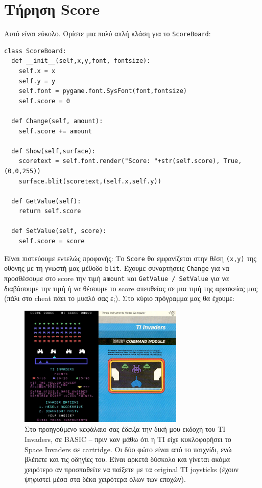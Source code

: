 \section{Τήρηση Score}
%
Αυτό είναι εύκολο. Ορίστε μια πολύ απλή κλάση για το {\tt ScoreBoard}:

\begin{verbatim}
class ScoreBoard:
  def __init__(self,x,y,font, fontsize):
    self.x = x
    self.y = y
    self.font = pygame.font.SysFont(font,fontsize)
    self.score = 0
        
  def Change(self, amount):
    self.score += amount

  def Show(self,surface):
    scoretext = self.font.render("Score: "+str(self.score), True, (0,0,255))
    surface.blit(scoretext,(self.x,self.y))

  def GetValue(self):
    return self.score

  def SetValue(self, score):
    self.score = score
\end{verbatim}

Είναι πιστεύουμε εντελώς προφανής: Το {\tt Score} θα εμφανίζεται στην θέση {\tt (x,y)} της οθόνης με τη γνωστή μας μέθοδο {\tt blit}. Έχουμε συναρτήσεις {\tt Change} για να προσθέσουμε στο score την τιμή {\tt amount} και {\tt GetValue / SetValue} για να διαβάσουμε την τιμή ή να θέσουμε το score απευθείας σε μια τιμή της αρεσκείας μας (πάλι στο cheat πάει το μυαλό σας ε;). Στο κύριο πρόγραμμα μας θα έχουμε:

\begin{figure}
\centering
\includegraphics[width=0.70\textwidth]{images/chapter9/ti-invaders}
\caption[TI Invaders]{Στο προηγούμενο κεφάλαιο σας έδειξα την δική μου εκδοχή του TI Invaders, σε BASIC -- πριν καν μάθω ότι η TI είχε κυκλοφορήσει το Space Invaders σε cartridge.  Οι δύο φώτο είναι από το παιχνίδι, ενώ βλέπετε και τις οδηγίες του. Είναι αρκετά δύσκολο και γίνεται ακόμα χειρότερο αν προσπαθείτε να παίξετε με τα original TI joysticks (έχουν ψηφιστεί μέσα στα δέκα χειρότερα όλων των εποχών).}
\label{9-4}
\end{figure}

